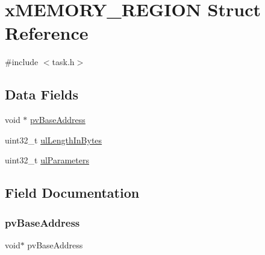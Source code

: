 \hypertarget{structx_m_e_m_o_r_y___r_e_g_i_o_n}{}\section{x\+M\+E\+M\+O\+R\+Y\+\_\+\+R\+E\+G\+I\+ON Struct Reference}
\label{structx_m_e_m_o_r_y___r_e_g_i_o_n}


{\ttfamily \#include $<$task.\+h$>$}

\subsection*{Data Fields}
\begin{DoxyCompactItemize}
\item 
void $\ast$ \hyperlink{structx_m_e_m_o_r_y___r_e_g_i_o_n_a5c540d9e8ba79b50b9600f7225d41268}{pv\+Base\+Address}
\item 
uint32\+\_\+t \hyperlink{structx_m_e_m_o_r_y___r_e_g_i_o_n_a53924a8e3f7db81a7803b646573864c6}{ul\+Length\+In\+Bytes}
\item 
uint32\+\_\+t \hyperlink{structx_m_e_m_o_r_y___r_e_g_i_o_n_a8339f23aad15c6b829547a17f839f32c}{ul\+Parameters}
\end{DoxyCompactItemize}


\subsection{Field Documentation}
\mbox{\label{structx_m_e_m_o_r_y___r_e_g_i_o_n_a5c540d9e8ba79b50b9600f7225d41268}} 
\subsubsection{\texorpdfstring{pv\+Base\+Address}{pvBaseAddress}}
{\footnotesize\ttfamily void$\ast$ pv\+Base\+Address}

\mbox{\label{structx_m_e_m_o_r_y___r_e_g_i_o_n_a53924a8e3f7db81a7803b646573864c6}} 
